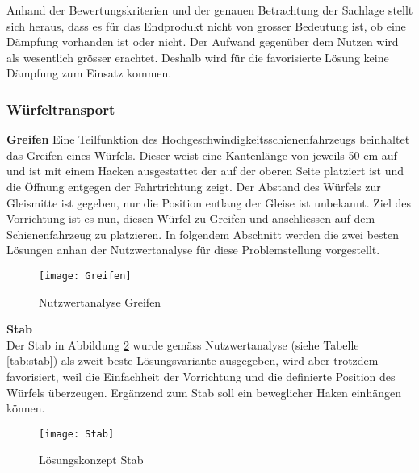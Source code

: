 \documentclass[../../main.tex]{subfiles}
\begin{document}
Anhand der Bewertungskriterien und der genauen Betrachtung der Sachlage stellt sich heraus, dass es für das Endprodukt nicht von grosser Bedeutung ist, ob eine Dämpfung vorhanden ist oder nicht. Der Aufwand gegenüber dem Nutzen wird als wesentlich grösser erachtet. Deshalb wird für die favorisierte Lösung keine Dämpfung zum Einsatz kommen.

\subsubsection{Würfeltransport}

\textbf{Greifen}
 Eine Teilfunktion des Hochgeschwindigkeitsschienenfahrzeugs beinhaltet das Greifen eines Würfels. Dieser weist eine Kantenlänge von jeweils 50 cm auf und ist mit einem Hacken ausgestattet der auf der oberen Seite platziert ist und die Öffnung entgegen der Fahrtrichtung zeigt. Der Abstand des Würfels zur Gleismitte ist gegeben, nur die Position entlang der Gleise ist unbekannt. Ziel des Vorrichtung ist es nun, diesen Würfel zu Greifen und anschliessen auf dem Schienenfahrzeug zu platzieren. In folgendem Abschnitt werden die zwei besten Lösungen anhan der Nutzwertanalyse für diese Problemstellung vorgestellt.

 \begin{figure}[H] %
    \centering
    \texttt{[image: Greifen]}
    \caption{Nutzwertanalyse Greifen}
    \label{fig:greifen}
\end{figure}

     \textbf{Stab}\\
 Der Stab in Abbildung \ref{fig:stab} wurde gemäss Nutzwertanalyse (siehe Tabelle \ref{tab:stab}) als zweit beste Lösungsvariante ausgegeben, wird aber trotzdem favorisiert, weil die Einfachheit der Vorrichtung und die definierte Position des Würfels überzeugen. Ergänzend zum Stab soll ein beweglicher Haken einhängen können.

 \begin{figure}[H] %
    \centering
    \texttt{[image: Stab]}
    \caption{Lösungskonzept Stab}
    \label{fig:stab}
\end{figure}
\end{document}
